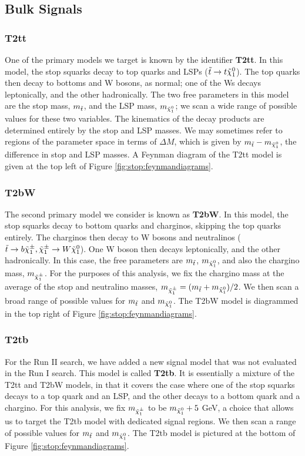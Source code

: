 \subsection{Bulk Signals}
\label{ssec:stop:sigbulk}

\subsubsection*{T2tt}

One of the primary models we target is known by the identifier
\textbf{T2tt}. In this model, the stop squarks decay to top quarks and
LSPs ($\tilde{t} \rightarrow t \tilde{\chi}^0_1$). The top quarks then decay to
bottoms and W bosons, as normal; one of the Ws decays leptonically,
and the other hadronically. The two free parameters in this model are
the stop mass, $m_{\tilde{t}}$, and the LSP mass, $m_{\tilde{\chi}^0_1}$; we
scan a wide range of possible values for these two variables. The
kinematics of the decay products are determined entirely by the stop
and LSP masses. We may sometimes refer to regions of the parameter
space in terms of $\Delta M$, which is given by $m_{\tilde{t}} - m_{\tilde{\chi}^0_1}$, the
difference in stop and LSP masses. A Feynman diagram of the T2tt model is
given at the top left of Figure \ref{fig:stop:feynmandiagrams}.

\subsubsection*{T2bW}

The second primary model we consider is known as \textbf{T2bW}. In this
model, the stop squarks decay to bottom quarks and charginos, skipping
the top quarks entirely. The charginos then decay to W bosons and
neutralinos ($\tilde{t} \rightarrow b \tilde{\chi}^\pm_1, \tilde{\chi}^\pm_1 \rightarrow
W \tilde{\chi}^0_1$). One W boson then decays leptonically, and the other
hadronically. In this case, the free parameters are $m_{\tilde{t}}$,
$m_{\tilde{\chi}^0_1}$, and also the chargino mass, $m_{\tilde{\chi}^\pm_1}$. For the
purposes of this analysis, we fix the chargino mass at the average of
the stop and neutralino masses, $m_{\tilde{\chi}^\pm_1} = (m_{\tilde{t}}
+ m_{\tilde{\chi}^0_1}) / 2$. We then scan a broad range of possible values
for $m_{\tilde{t}}$ and $m_{\tilde{\chi}^0_1}$. The T2bW model is diagrammed in
the top right of Figure \ref{fig:stop:feynmandiagrams}.

\subsubsection*{T2tb}

For the Run II search, we have added a new signal model that was not
evaluated in the Run I search. This model is called \textbf{T2tb}. It
is essentially a mixture of the T2tt and T2bW models, in that it
covers the case where one of the stop squarks decays to a top quark
and an LSP, and the other decays to a bottom quark and a chargino. For
this analysis, we fix $m_{\tilde{\chi}^\pm_1}$ to be $m_{\tilde{\chi}^0_1} + 5$ GeV, a choice
that allows us to target the T2tb model with dedicated
signal regions. We then scan a range of possible values for $m_{\tilde{t}}$ and
$m_{\tilde{\chi}^0_1}$. The T2tb model is pictured at the bottom of Figure
\ref{fig:stop:feynmandiagrams}.

